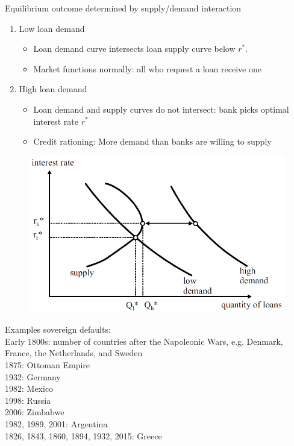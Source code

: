\documentclass{beamer}
\begin{document}
\begin{frame}
 Equilibrium outcome determined by supply/demand interaction
\begin{enumerate}
  \item Low loan demand
  \begin{itemize}
    \item Loan demand curve intersects loan supply curve below $r^*$. 
    \item Market functions normally: all who request a loan receive one
\end{itemize}
\medskip
  \item High loan demand
  \begin{itemize}
    \item Loan demand and supply curves do not intersect: bank picks optimal interest rate $r^*$    
    \item Credit rationing: More demand than banks are willing to supply
  \end{itemize}
\end{enumerate}
\end{frame}

\begin{frame}
  \begin{figure}
    \includegraphics[scale=.9]{credit_rationing.eps}
  \end{figure}
\end{frame}

\begin{frame}
 Examples sovereign defaults:\\
 \medskip
 Early 1800s: number of countries after the Napoleonic Wars, e.g. Denmark, France, the Netherlands, and Sweden\\
 1875: Ottoman Empire\\
 1932: Germany\\
 1982: Mexico\\
 1998: Russia\\
 2006: Zimbabwe\\
 1982, 1989, 2001: Argentina\\
 1826, 1843, 1860, 1894, 1932, 2015: Greece
\end{frame}
\end{document}
